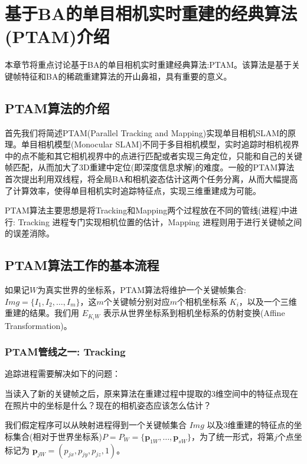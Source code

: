 
\def \R2{\mathbb{R}^2}
\def \R3{\mathbb{R}^3}
\def \Rn{\mathbb{R}^n}

\def \itW{\mathit{W}}

\def \itK{\mathit{K}}
\def \bfp{\mathbf{p}}

\chapter{基于BA的单目相机实时重建的经典算法(PTAM)介绍}

本章节将重点讨论基于BA的单目相机实时重建经典算法:PTAM。该算法是基于关键帧特征和BA的稀疏重建算法的开山鼻祖，具有重要的意义。

\section{PTAM算法的介绍}
首先我们将简述PTAM\cite{Klein2007}(Parallel Tracking and Mapping)实现单目相机SLAM的原理。单目相机模型(Monocular SLAM)不同于多目相机模型，实时追踪时相机视界中的点不能和其它相机视界中的点进行匹配或者实现三角定位，只能和自己的关键帧匹配，从而加大了3D重建中定位(即深度信息求解)的难度。一般的PTAM算法首次提出利用双线程，将全局BA和相机姿态估计这两个任务分离，从而大幅提高了计算效率，使得单目相机实时追踪特征点，实现三维重建成为可能。

PTAM算法主要思想是将Tracking和Mapping两个过程放在不同的管线(进程)中进行: Tracking 进程专门实现相机位置的估计，Mapping 进程则用于进行关键帧之间的误差消除。

\section{PTAM算法工作的基本流程}
如果记$\itW$为真实世界的坐标系，PTAM算法将维护一个关键帧集合: $Img=\{I_1,I_2,\ldots,I_m\}$，这\(m\)个关键帧分别对应\(m\)个相机坐标系 $\itK_i$，以及一个三维重建的结果。我们用 $E_{\itK_i\itW}$ 表示从世界坐标系到相机坐标系的仿射变换(Affine Transformation)。


\subsection{PTAM管线之一: Tracking}


追踪进程需要解决如下的问题：

当读入了新的关键帧之后，原来算法在重建过程中提取的3维空间中的特征点现在在照片中的坐标是什么？现在的相机姿态应该怎么估计？ 

我们假定程序可以从映射进程得到一个关键帧集合 $Img$ 以及3维重建的特征点的坐标集合(相对于世界坐标系)$P=P_\itW=\{\bfp_{1\itW},\ldots,\bfp_{s\itW}\}$，为了统一形式，将第$j$个点坐标记为 $\bfp_{j\itW}= (p_{jx},p_{jy},p_{jz},1)$。

